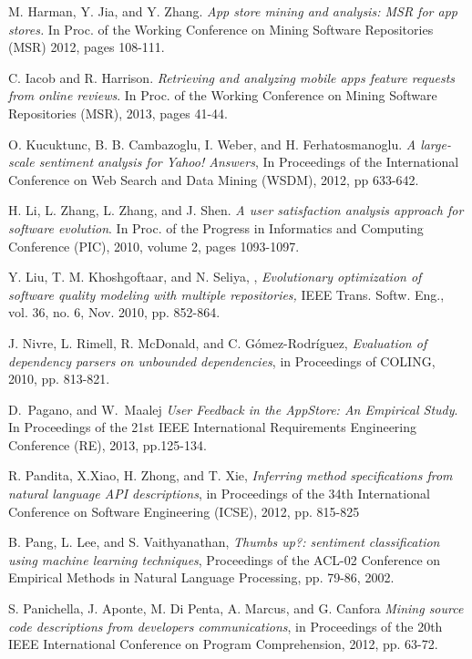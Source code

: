\documentclass[conference]{IEEEtran}
\begin{document}
\begin{thebibliography}{1}
M. Harman, Y. Jia, and Y. Zhang. \emph{App store mining and analysis: MSR for app stores.} In Proc. of the Working Conference on Mining Software Repositories (MSR) 2012, pages 108-111.

C. Iacob and R. Harrison. \emph{Retrieving and analyzing mobile apps feature requests from online reviews}. In Proc. of the Working Conference on Mining Software Repositories (MSR), 2013, pages 41-44.

O. Kucuktunc, B. B. Cambazoglu, I. Weber, and H. Ferhatosmanoglu. \emph{A large-scale sentiment analysis for Yahoo! Answers}, In Proceedings of the International Conference on Web Search and Data Mining (WSDM), 2012, pp 633-642.

H. Li, L. Zhang, L. Zhang, and J. Shen. \emph{A user satisfaction analysis approach for software evolution}. In Proc. of the Progress in Informatics and Computing Conference (PIC), 2010, volume 2, pages 1093-1097.

Y. Liu, T. M. Khoshgoftaar, and N. Seliya, , \emph{Evolutionary optimization of software quality modeling with multiple repositories,} IEEE Trans. Softw. Eng., vol. 36, no. 6, Nov. 2010, pp. 852-864. 

J. Nivre, L. Rimell, R. McDonald, and C. G\'omez-Rodr\'iguez, \emph{Evaluation of dependency parsers on unbounded dependencies}, in Proceedings of COLING, 2010, pp. 813-821.

D.~Pagano, and W.~Maalej \emph{User Feedback in the AppStore: An Empirical Study}. In Proceedings of the 21st IEEE International Requirements Engineering Conference (RE), 2013, pp.125-134.

R. Pandita, X.Xiao, H. Zhong, and T. Xie, \emph{Inferring method specifications from natural language API descriptions}, in Proceedings of the 34th International Conference on Software Engineering (ICSE), 2012, pp. 815-825

B. Pang, L. Lee,  and S. Vaithyanathan,  \emph{Thumbs up?: sentiment classification using machine learning techniques}, Proceedings of the ACL-02 Conference on Empirical Methods in Natural Language Processing, pp. 79-86, 2002.

S. Panichella, J. Aponte, M. Di Penta, A. Marcus, and G. Canfora \emph{Mining source code descriptions from developers communications}, in Proceedings of the 20th IEEE International Conference on Program Comprehension, 2012, pp. 63-72.


\end{thebibliography}
\end{document}
